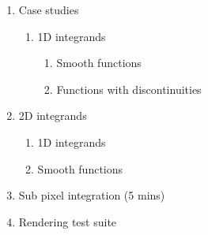 \begin{enumerate}
\begin{enumerate}
	\end{enumerate}
	\item Case studies
	\begin{enumerate}
	\itemsep-0.4em
		\item 1D integrands
		\begin{enumerate}
		\itemsep-0.6em
			\item Smooth functions
			\item Functions with discontinuities
		\end{enumerate}
	\end{enumerate}
	\item 2D integrands
		\begin{enumerate}
		\itemsep-0.4em
			\item 1D integrands
			\item Smooth functions
		\end{enumerate}
	\item Sub pixel integration (5 mins)
	\item Rendering test suite
\end{enumerate}







